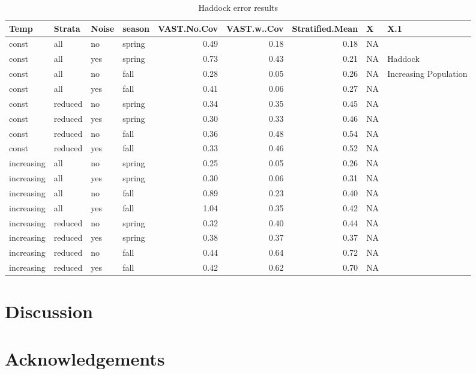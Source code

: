 \documentclass[
]{article}
\begin{document}
\begin{table}

\caption{\label{tab:unnamed-chunk-1}Haddock error results}
\centering
\begin{tabular}[t]{l|l|l|l|r|r|r|l|l}
\hline
Temp & Strata & Noise & season & VAST.No.Cov & VAST.w..Cov & Stratified.Mean & X & X.1\\
\hline
const & all & no & spring & 0.49 & 0.18 & 0.18 & NA & \\
\hline
const & all & yes & spring & 0.73 & 0.43 & 0.21 & NA & Haddock\\
\hline
const & all & no & fall & 0.28 & 0.05 & 0.26 & NA & Increasing Population\\
\hline
const & all & yes & fall & 0.41 & 0.06 & 0.27 & NA & \\
\hline
const & reduced & no & spring & 0.34 & 0.35 & 0.45 & NA & \\
\hline
const & reduced & yes & spring & 0.30 & 0.33 & 0.46 & NA & \\
\hline
const & reduced & no & fall & 0.36 & 0.48 & 0.54 & NA & \\
\hline
const & reduced & yes & fall & 0.33 & 0.46 & 0.52 & NA & \\
\hline
increasing & all & no & spring & 0.25 & 0.05 & 0.26 & NA & \\
\hline
increasing & all & yes & spring & 0.30 & 0.06 & 0.31 & NA & \\
\hline
increasing & all & no & fall & 0.89 & 0.23 & 0.40 & NA & \\
\hline
increasing & all & yes & fall & 1.04 & 0.35 & 0.42 & NA & \\
\hline
increasing & reduced & no & spring & 0.32 & 0.40 & 0.44 & NA & \\
\hline
increasing & reduced & yes & spring & 0.38 & 0.37 & 0.37 & NA & \\
\hline
increasing & reduced & no & fall & 0.44 & 0.64 & 0.72 & NA & \\
\hline
increasing & reduced & yes & fall & 0.42 & 0.62 & 0.70 & NA & \\
\hline
\end{tabular}
\end{table}

\section{Discussion}

\section{Acknowledgements}
\end{document}

